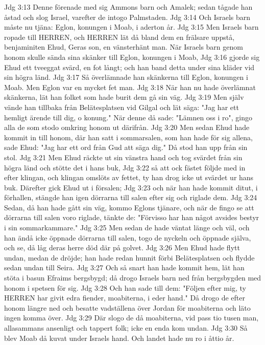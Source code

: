 Jdg 3:13  Denne förenade med sig Ammons barn och Amalek; sedan tågade han åstad och slog Israel, varefter de intogo Palmstaden.
Jdg 3:14  Och Israels barn måste nu tjäna: Eglon, konungen i Moab, i aderton år.
Jdg 3:15  Men Israels barn ropade till HERREN, och HERREN lät då bland dem en frälsare uppstå, benjaminiten Ehud, Geras son, en vänsterhänt man. När Israels barn genom honom skulle sända sina skänker till Eglon, konungen i Moab,
Jdg 3:16  gjorde sig Ehud ett tveeggat svärd, en fot långt; och han band detta under sina kläder vid sin högra länd.
Jdg 3:17  Så överlämnade han skänkerna till Eglon, konungen i Moab. Men Eglon var en mycket fet man.
Jdg 3:18  När han nu hade överlämnat skänkerna, lät han folket som hade burit dem gå sin väg.
Jdg 3:19  Men själv vände han tillbaka från Belätesplatsen vid Gilgal och lät säga: "Jag har ett hemligt ärende till dig, o konung." När denne då sade: "Lämnen oss i ro", gingo alla de som stodo omkring honom ut därifrån.
Jdg 3:20  Men sedan Ehud hade kommit in till honom, där han satt i sommarsalen, som han hade för sig allena, sade Ehud: "Jag har ett ord från Gud att säga dig." Då stod han upp från sin stol.
Jdg 3:21  Men Ehud räckte ut sin vänstra hand och tog svärdet från sin högra länd och stötte det i hans buk,
Jdg 3:22  så att ock fästet följde med in efter klingan, och klingan omslöts av fettet, ty han drog icke ut svärdet ur hans buk. Därefter gick Ehud ut i försalen;
Jdg 3:23  och när han hade kommit ditut, i förhallen, stängde han igen dörrarna till salen efter sig och riglade dem.
Jdg 3:24  Sedan, då han hade gått sin väg, kommo Eglons tjänare, och när de fingo se att dörrarna till salen voro riglade, tänkte de: "Förvisso har han något avsides bestyr i sin sommarkammare."
Jdg 3:25  Men sedan de hade väntat länge och väl, och han ändå icke öppnade dörrarna till salen, togo de nyckeln och öppnade själva, och se, då låg deras herre död där på golvet.
Jdg 3:26  Men Ehud hade flytt undan, medan de dröjde; han hade redan hunnit förbi Belätesplatsen och flydde sedan undan till Seira.
Jdg 3:27  Och så snart han hade kommit hem, lät han stöta i basun Efraims bergsbygd; då drogo Israels barn ned från bergsbygden med honom i spetsen för sig.
Jdg 3:28  Och han sade till dem: "Följen efter mig, ty HERREN har givit edra fiender, moabiterna, i eder hand." Då drogo de efter honom längre ned och besatte vadställena över Jordan för moabiterna och läto ingen komma över.
Jdg 3:29  Där slogo de då moabiterna, vid pass tio tusen man, allasammans ansenligt och tappert folk; icke en enda kom undan.
Jdg 3:30  Så blev Moab då kuvat under Israels hand. Och landet hade nu ro i åttio år.
